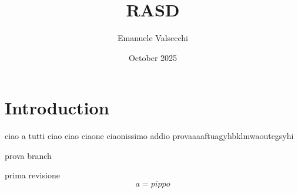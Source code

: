 \documentclass{article}
\title{RASD}
\author{Emanuele Valsecchi}
\date{October 2025}
\begin{document}
\maketitle

\section{Introduction}

ciao a tutti
ciao ciao
ciaone
ciaonissimo
addio
provaaaaftuagyhbklmwaoutegsyhi

prova
branch

prima revisione\begin{equation}
    a = pippo
\end{equation}
\end{document}
